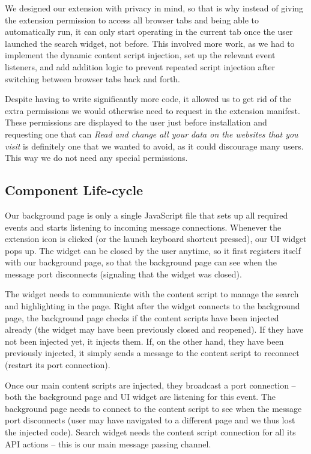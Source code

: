 \documentclass[bsc,frontabs,twoside,singlespacing,parskip,deptreport]{infthesis}
\begin{document}
We designed our extension with privacy in mind, so that is why instead of giving the extension permission to access all browser tabs and being able to automatically run, it can only start operating in the current tab once the user launched the search widget, not before. This involved more work, as we had to implement the dynamic content script injection, set up the relevant event listeners, and add addition logic to prevent repeated script injection after switching between browser tabs back and forth.

Despite having to write significantly more code, it allowed us to get rid of the extra permissions we would otherwise need to request in the extension manifest. These permissions are displayed to the user just before installation and requesting one that can \textit{Read and change all your data on the websites that you visit} is definitely one that we wanted to avoid, as it could discourage many users. This way we do not need any special permissions.

\subsection{Component Life-cycle}
Our background page is only a single JavaScript file that sets up all required events and starts listening to incoming message connections. Whenever the extension icon is clicked (or the launch keyboard shortcut pressed), our UI widget pops up. The widget can be closed by the user anytime, so it first registers itself with our background page, so that the background page can see when the message port disconnects (signaling that the widget was closed). 

The widget needs to communicate with the content script to manage the search and highlighting in the page. Right after the widget connects to the background page, the background page checks if the content scripts have been injected already (the widget may have been previously closed and reopened). If they have not been injected yet, it injects them. If, on the other hand, they have been previously injected, it simply sends a message to the content script to reconnect (restart its port connection). 

Once our main content scripts are injected, they broadcast a port connection -- both the background page and UI widget are listening for this event. The background page needs to connect to the content script to see when the message port disconnects (user may have navigated to a different page and we thus lost the injected code). Search widget needs the content script connection for all its API actions -- this is our main message passing channel.
\end{document}
